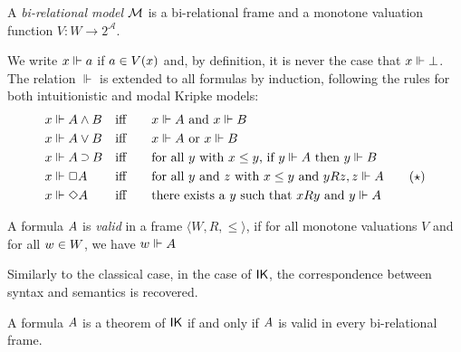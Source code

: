 \documentclass[twoside]{aiml20}
\begin{document}
\begin{definition}
	A \emph{bi-relational model} $\mathcal{M}$ is %
	a bi-relational frame and a monotone valuation function $V\colon W \to 2^\mathcal{A}$.%
\end{definition}

We write $x \Vdash a$ if $a \in V(x)$ and, by definition, it is never the case that $x \Vdash \mathord{\bot}$. %
%
The relation $\Vdash$ is extended to all formulas by induction, following the rules for both intuitionistic and modal Kripke models:
\begin{align}
	&\lb x \Vdash \fm{A \AND B} && \text{iff}\qquad 
	\lb x \Vdash \fm A \text{ and } \lb x \Vdash \fm B
	\nonumber\\
	&\lb x \Vdash \fm{A \OR B} && \text{iff}\qquad 
	\lb x \Vdash \fm A \text{ or } \lb x \Vdash \fm B
	\nonumber\\
	&\lb x \Vdash \fm{A \IMP B} && \text{iff}\qquad 
	\text{for all } \lb y \text{ with } \futs xy\text{, if }\lb y \Vdash \fm A\text{ then }\lb y \Vdash \fm B
	\nonumber\\
	&\lb x \Vdash \fm{\BOX A} && \text{iff}\qquad
	\text{for all }\lb y\text{ and }\lb z\text{ with }\futs xy\text{ and }\accs yz, \lb z \Vdash \fm A %
	\tag{$\star$}\label{eq:box}\\
	&\lb x \Vdash \fm{\DIA A} && \text{iff}\qquad
	\text{there exists a }\lb y\text{ such that }\accs xy\text{ and }\lb y \Vdash \fm A
	\nonumber
\end{align}

\begin{definition}
	A formula $A$ is \emph{valid} in a frame $\langle W, R, \le \rangle$, if for all monotone valuations $V$ and for all $w \in W$, we have $w \Vdash A$
\end{definition}

Similarly to the classical case, in the case of $\mathsf{IK}$, the correspondence between syntax and semantics is recovered.

\begin{theorem}\label{thm:plotkin}
	A formula $A$ is a theorem of $\mathsf{IK}$ if and only if $A$ is valid in every bi-relational frame.
\end{theorem}
\end{document}
